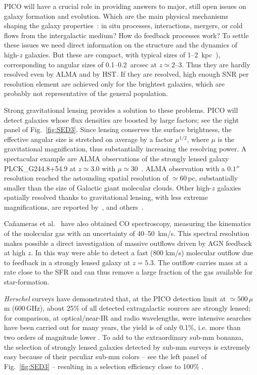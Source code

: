 \documentclass[PICOReport.tex]{subfiles}
\begin{document}
PICO will have a crucial role in providing answers to major, still open issues on galaxy formation and evolution. Which are the main physical mechanisms shaping the galaxy properties~\citep{SilkMamon2012, SomervilleDave2015}: in situ processes, interactions, mergers, or cold flows  from the intergalactic medium? How do feedback processes work? To settle these issues we need direct information on the structure and the dynamics of high-$z$ galaxies. But these are compact, with typical sizes of 1--2~kpc~\cite{Fujimoto2018}), corresponding to angular sizes of 0.1--0.2~arcsec at $z\simeq 2$--3. Thus they are hardly resolved even by ALMA and by HST. If they are resolved, high enough \ac{SNR} per resolution element are achieved only for the brightest galaxies, which are probably not representative of the general population.

Strong gravitational lensing provides a solution to these problems. PICO will detect galaxies whose flux densities are boosted by large factors; see the right panel of Fig.~\ref{fig:SED3}. Since lensing conserves the surface brightness, the effective angular size is stretched on average by a factor $\mu^{1/2}$, where $\mu$ is the gravitational magnification, thus substantially increasing the resolving power. A spectacular example are ALMA observations of the strongly lensed galaxy PLCK\_G244.8\-+54.9 at $z \simeq 3.0$  with $\mu \simeq 30$~\citep{Canameras2017ALMA}. ALMA observation with a $0.1''$ resolution reached the astounding spatial resolution of $\simeq 60\,$pc, substantially smaller than the size of Galactic giant molecular clouds. Other high-$z$ galaxies spatially resolved thanks to gravitational lensing, with less extreme magnifications, are reported by~\citet{Dye2018}, and others~\citep{Lamarche2018, Sharda2018}.

Ca\~{n}ameras et al.~\citep{Canameras2017ALMA} have also obtained CO spectroscopy, measuring the kinematics of the molecular gas with an uncertainty of 40--50~km/s. This spectral resolution makes possible a direct investigation of massive outflows driven by AGN feedback at high $z$. In this way \citet{Spilker2018} were able to detect a fast (800 km/s) molecular outflow due to feedback in a strongly lensed galaxy at $z=5.3$. The outflow carries mass at a rate close to the SFR and can thus remove a large fraction of the gas available for star-formation.

\textit{Herschel} surveys have demonstrated that, at the PICO detection limit at $\simeq 500\,\mu$m (600\,GHz), about 25\% of all detected extragalactic sources are strongly lensed; for comparison, at optical/near-IR and radio wavelengths, were intensive searches have been carried out for many years, the yield is of only 0.1\%, i.e. more than two orders of magnitude lower \cite{Treu2010}. To add to the extraordinary sub-mm bonanza, the selection of strongly lensed galaxies detected by sub-mm surveys is extremely easy because of their peculiar sub-mm colors -- see the left panel of Fig.~\ref{fig:SED3} -- resulting in a selection efficiency close to 100\% \citep{Negrello2010}.
\end{document}
